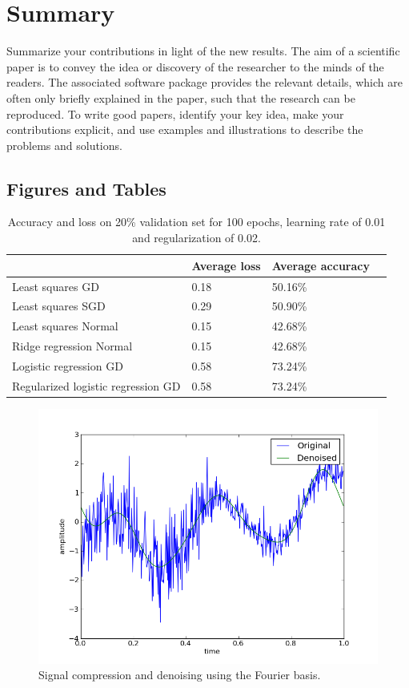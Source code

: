 \documentclass[10pt,conference,compsocconf]{IEEEtran}
\begin{document}
\section{Summary}\label{sec: summary}
Summarize your contributions in light of the new
  results.
The aim of a scientific paper is to convey the idea or discovery of
the researcher to the minds of the readers. The associated software
package provides the relevant details, which are often only briefly
explained in the paper, such that the research can be reproduced.
To write good papers, identify your key idea, make your contributions
explicit, and use examples and illustrations to describe the problems
and solutions.

\subsection{Figures and Tables}
\begin{table}[htbp]
  \centering
  \begin{tabular}[c]{|l||l|l|l|}
    \hline
    &Average loss&Average accuracy \\
    \hline
    Least squares GD & 0.18 & 50.16\% \\
    Least squares SGD & 0.29 & 50.90\%\\
    Least squares Normal & 0.15 & 42.68\%\\
    Ridge regression Normal & 0.15 & 42.68\%\\
    Logistic regression GD & 0.58 & 73.24\%\\
    Regularized logistic regression GD & 0.58 & 73.24\% \\
    \hline
  \end{tabular}
  \caption{Accuracy and loss on 20\% validation set for 100 epochs, learning rate of 0.01 and regularization of 0.02. }
  \label{tab:basic_training}
\end{table}
\begin{figure}[tbp]
  \centering
  \includegraphics[width=\columnwidth]{denoised_signal_1d}
  \caption{Signal compression and denoising using the Fourier basis.}
  \vspace{-3mm}
  \label{fig:denoise-fourier}
\end{figure}
\end{document}
